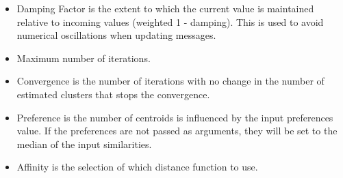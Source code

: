 \begin{itemize}

\item Damping Factor is the extent to which the current value is maintained relative to incoming values (weighted 1 - damping). This is used to avoid numerical oscillations when updating messages.

\item Maximum number of iterations.

\item Convergence is the number of iterations with no change in the number of estimated clusters that stops the convergence.

\item Preference is the number of centroids is influenced by the input preferences value. If the preferences are not passed as arguments, they will be set to the median of the input similarities.

\item Affinity is the selection of which distance function to use.


\end{itemize}

